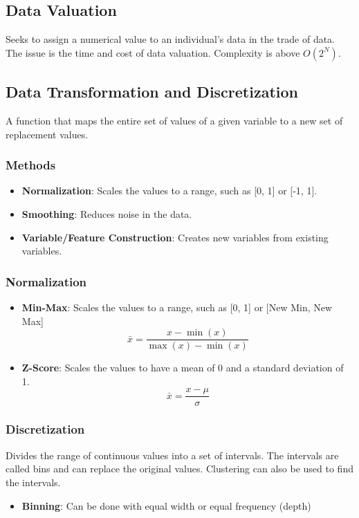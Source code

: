 \subsection*{Data Valuation}
Seeks to assign a numerical value to an individual's data in the trade of data. The issue is the time and cost of data valuation. Complexity is above $O(2^N)$.

\subsection*{Data Transformation and Discretization}
A function that maps the entire set of values of a given variable to a new set of replacement values.

\subsubsection*{Methods}
\begin{itemize}[noitemsep]
    \item \textbf{Normalization}: Scales the values to a range, such as [0, 1] or [-1, 1].
    \item \textbf{Smoothing}: Reduces noise in the data.
    \item \textbf{Variable/Feature Construction}: Creates new variables from existing variables.
\end{itemize}

\subsubsection*{Normalization}
\begin{itemize}[noitemsep]
    \item \textbf{Min-Max}: Scales the values to a range, such as [0, 1] or [New Min, New Max]
    $$\bar{x} = \frac{x - \min(x)}{\max(x) - \min(x)}$$
    
    \item \textbf{Z-Score}: Scales the values to have a mean of 0 and a standard deviation of 1.
    $$\bar{x} = \frac{x - \mu}{\sigma}$$
\end{itemize}

\subsubsection*{Discretization}
Divides the range of continuous values into a set of intervals. The intervals are called bins and can replace the original values. Clustering can also be used to find the intervals.
\begin{itemize}[noitemsep]
    \item \textbf{Binning}: Can be done with equal width or equal frequency (depth)
\end{itemize}

